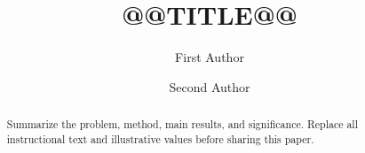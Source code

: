 \documentclass[sigconf,nonacm]{acmart}
\title{@@TITLE@@}
\author{First Author}
\affiliation{%
  \institution{Institution}
  \city{City}
  \country{Country}}
\author{Second Author}
\affiliation{%
  \institution{Institution}
  \city{City}
  \country{Country}}
\begin{document}
\begin{abstract}
Summarize the problem, method, main results, and significance. Replace all
instructional text and illustrative values before sharing this paper.
\end{abstract}
\maketitle




\end{document}
